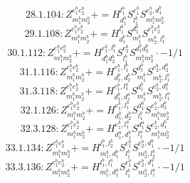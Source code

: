 \documentclass[letterpaper,10pt,fleqn,leqno,onecolumn]{article}
\begin{document}
\begin{equation} \;\;\;\;\;\;  28.1.104: Z^{e_{1}^{b}e_{2}^{b}}_{m_{1}^{b}m_{2}^{b}}+=H^{l_{1}^{b}}_{d_{1}^{b}}S^{e_{1}^{b}}_{l_{1}^{b}}S^{e_{2}^{b},d_{1}^{b}}_{m_{1}^{b}m_{2}^{b}} \end{equation}
\begin{equation} \;\;\;\;\;\;  29.1.108: Z^{e_{1}^{b}e_{2}^{b}}_{m_{1}^{b}m_{2}^{b}}+=H^{l_{1}^{b}}_{d_{1}^{b}}S^{d_{1}^{b}}_{m_{1}^{b}}S^{e_{1}^{b}e_{2}^{b}}_{m_{2}^{b},l_{1}^{b}} \end{equation}
\begin{equation} \;\;\;\;\;\;  30.1.112: Z^{e_{1}^{b}e_{2}^{b}}_{m_{1}^{b}m_{2}^{b}}+=H^{e_{1}^{b},l_{1}^{b}}_{d_{1}^{b}d_{2}^{b}}S^{e_{2}^{b}}_{l_{1}^{b}}S^{d_{1}^{b}d_{2}^{b}}_{m_{1}^{b}m_{2}^{b}}\cdot -1/1 \end{equation}
\begin{equation} \;\;\;\;\;\;  31.1.116: Z^{e_{1}^{b}e_{2}^{b}}_{m_{1}^{b}m_{2}^{b}}+=H^{e_{1}^{b},l_{1}^{b}}_{d_{1}^{b},d_{2}^{b}}S^{d_{1}^{b}}_{m_{1}^{b}}S^{e_{2}^{b},d_{2}^{b}}_{m_{2}^{b},l_{1}^{b}} \end{equation}
\begin{equation} \;\;\;\;\;\;  31.3.118: Z^{e_{1}^{b}e_{2}^{b}}_{m_{1}^{b}m_{2}^{b}}+=H^{e_{1}^{b},l_{1}^{a}}_{d_{1}^{b},d_{1}^{a}}S^{d_{1}^{b}}_{m_{1}^{b}}S^{e_{2}^{b},d_{1}^{a}}_{m_{2}^{b},l_{1}^{a}} \end{equation}
\begin{equation} \;\;\;\;\;\;  32.1.126: Z^{e_{1}^{b}e_{2}^{b}}_{m_{1}^{b}m_{2}^{b}}+=H^{e_{1}^{b},l_{1}^{b}}_{d_{1}^{b},d_{2}^{b}}S^{d_{1}^{b}}_{l_{1}^{b}}S^{e_{2}^{b},d_{2}^{b}}_{m_{1}^{b}m_{2}^{b}} \end{equation}
\begin{equation} \;\;\;\;\;\;  32.3.128: Z^{e_{1}^{b}e_{2}^{b}}_{m_{1}^{b}m_{2}^{b}}+=H^{e_{1}^{b},l_{1}^{a}}_{d_{1}^{a},d_{1}^{b}}S^{d_{1}^{a}}_{l_{1}^{a}}S^{e_{2}^{b},d_{1}^{b}}_{m_{1}^{b}m_{2}^{b}} \end{equation}
\begin{equation} \;\;\;\;\;\;  33.1.134: Z^{e_{1}^{b}e_{2}^{b}}_{m_{1}^{b}m_{2}^{b}}+=H^{l_{1}^{b},l_{2}^{b}}_{m_{1}^{b},d_{1}^{b}}S^{e_{1}^{b}}_{l_{1}^{b}}S^{e_{2}^{b},d_{1}^{b}}_{m_{2}^{b},l_{2}^{b}}\cdot -1/1 \end{equation}
\begin{equation} \;\;\;\;\;\;  33.3.136: Z^{e_{1}^{b}e_{2}^{b}}_{m_{1}^{b}m_{2}^{b}}+=H^{l_{1}^{b},l_{1}^{a}}_{m_{1}^{b},d_{1}^{a}}S^{e_{1}^{b}}_{l_{1}^{b}}S^{e_{2}^{b},d_{1}^{a}}_{m_{2}^{b},l_{1}^{a}}\cdot -1/1 \end{equation}
\end{document}
